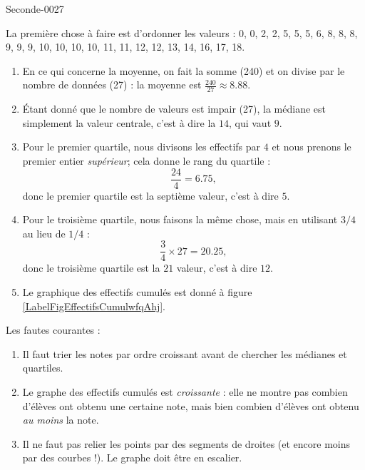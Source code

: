 
\begin{corrige}{Seconde-0027}

    La première chose à faire est d'ordonner les valeurs : 0, 0, 2, 2, 5, 5, 5, 6, 8, 8, 8, 9, 9, 9, 10, 10, 10, 10, 11, 11, 12, 12, 13, 14, 16, 17, 18.
    \begin{enumerate}
        \item
            En ce qui concerne la moyenne, on fait la somme (240) et on divise par le nombre de données (27) : la moyenne est \( \frac{ 240 }{ 27 }\approx 8.88\).
        \item
            Étant donné que le nombre de valeurs est impair (27), la médiane est simplement la valeur centrale, c'est à dire la \( 14\), qui vaut \( 9\).
        \item
            Pour le premier quartile, nous divisons les effectifs par \( 4\) et nous prenons le premier entier \emph{supérieur}; cela donne le rang du quartile :
            \begin{equation}
                \frac{ 24 }{ 4 }=6.75,
            \end{equation}
            donc le premier quartile est la septième valeur, c'est à dire \( 5\).
        \item
            Pour le troisième quartile, nous faisons la même chose, mais en utilisant \( 3/4\) au lieu de \( 1/4\) :
            \begin{equation}
                \frac{ 3 }{ 4 }\times 27=20.25,
            \end{equation}
            donc le troisième quartile est la \( 21\) valeur, c'est à dire \( 12\).
        \item
            Le graphique des effectifs cumulés est donné à figure \ref{LabelFigEffectifsCumulwfqAhj}.
            \newcommand{\CaptionFigEffectifsCumulwfqAhj}{Le graphique des effectifs cumulés de l'exercice \ref{exoSeconde-0027}.}


    \end{enumerate}

            Les fautes courantes :
            \begin{enumerate}
                \item
                    Il faut trier les notes par ordre croissant avant de chercher les médianes et quartiles.
                \item
                    Le graphe des effectifs cumulés est \emph{croissante} : elle ne montre pas combien d'élèves ont obtenu une certaine note, mais bien combien d'élèves ont obtenu \emph{au moins} la note.
                \item
                    Il ne faut pas relier les points par des segments de droites (et encore moins par des courbes !). Le graphe doit être en escalier.
            \end{enumerate}


\end{corrige}
